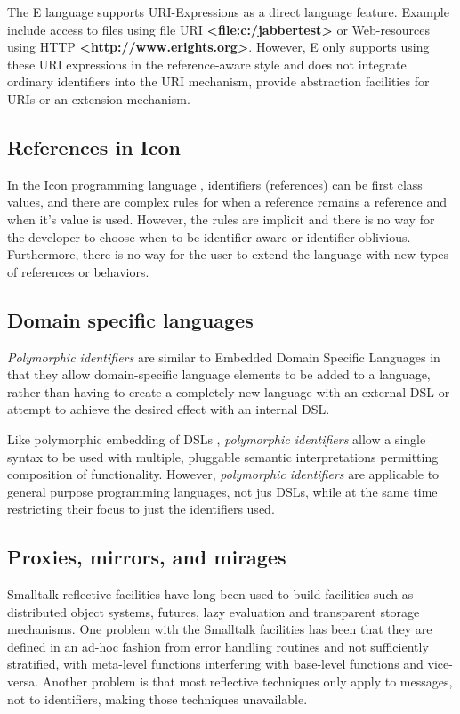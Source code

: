 \documentclass[preprint,authoryear]{acm_proc_article-sp}
\begin{document}
The E language\cite{MillerRobustComposition}  supports URI-Expressions as a
direct language feature.  Example include access to files
using file URI  {\bf <file:c:/jabbertest>} or Web-resources using HTTP {\bf <http://www.erights.org>}.  However,
E only supports using these URI expressions in the reference-aware style and does not integrate 
ordinary identifiers into the URI mechanism, provide abstraction facilities 
for URIs or an extension mechanism. 


\subsection{References in Icon}

In the Icon programming language \cite{IconRef} , identifiers (references) can be first class values,
and there are complex rules for when a reference remains a reference and when
it's value is used.  However, the rules are implicit and there is no way for the 
developer to choose when to be identifier-aware or identifier-oblivious.  Furthermore,
there is no way for the user to extend the language with new types of references 
or behaviors.



\subsection{Domain specific languages}

\emph{Polymorphic identifiers} are similar to Embedded Domain Specific Languages\cite{edsl}
in that they allow domain-specific language elements to be added to a language, rather
than having to create a completely new language with an external DSL or attempt to 
achieve the desired effect with an internal DSL\cite{fowlerdsl}.  

Like polymorphic embedding of DSLs \cite{polydsl}, \emph{polymorphic identifiers} allow
a single syntax to be used with multiple, pluggable semantic interpretations permitting
composition of functionality\cite{embeddeddsl}.  However, \emph{polymorphic identifiers}
are applicable to general purpose programming languages, not jus DSLs, while
at the same time restricting their focus to just the identifiers used.

\subsection{Proxies, mirrors, and mirages}

Smalltalk reflective facilities \cite{reflective-st} have long been used to build
facilities such as distributed object systems, futures, lazy evaluation and
transparent storage mechanisms.  One problem with the Smalltalk facilities
has been that they are defined in an ad-hoc fashion from error handling routines
and not sufficiently stratified, with meta-level functions
interfering with base-level functions and vice-versa.  Another problem is that
most reflective techniques only apply to messages, not to identifiers, making 
those techniques unavailable.
\end{document}
